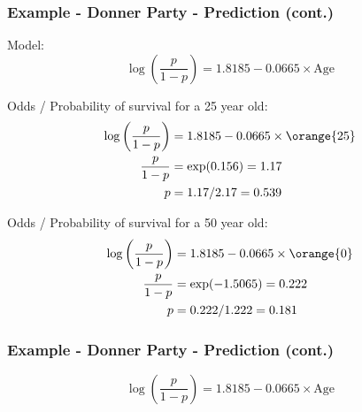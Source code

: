 
\begin{frame}
\frametitle{Example - Donner Party - Prediction (cont.)}

Model:
{\scriptsize
\[\log\left(\frac{p}{1-p}\right) = 1.8185-0.0665\times \text{Age}\]
}

Odds / Probability of survival for a 25 year old:
\pause
{\scriptsize
\begin{align*}
\log\left(\frac{p}{1-p}\right) &= 1.8185-0.0665\times \orange{25}\\
\frac{p}{1-p} &= \exp(0.156) = 1.17 \\
p &= 1.17/2.17 = 0.539 
\end{align*}
}

\pause

Odds / Probability of survival for a 50 year old:
\pause
{\scriptsize
\begin{align*}
\log\left(\frac{p}{1-p}\right) &= 1.8185-0.0665\times \orange{0}\\
\frac{p}{1-p} &= \exp(-1.5065) = 0.222 \\
p &= 0.222/1.222 =  0.181
\end{align*}
}

\end{frame}


\begin{frame}
\frametitle{Example - Donner Party - Prediction (cont.)}

{\scriptsize
\[\log\left(\frac{p}{1-p}\right) = 1.8185-0.0665\times \text{Age}\]
}

\vspace{-10mm}

\begin{center}
\end{center}
\end{frame}

